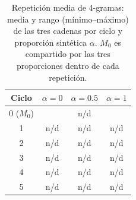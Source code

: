 
\begin{table}[ht]
\centering
\footnotesize
\begin{tabular}{c c c c}
\hline
Ciclo & $\alpha=0$ & $\alpha=0.5$ & $\alpha=1$ \\
\hline
0 ($M_0$) & \multicolumn{3}{c}{n/d} \\
1 & n/d & n/d & n/d \\
2 & n/d & n/d & n/d \\
3 & n/d & n/d & n/d \\
4 & n/d & n/d & n/d \\
5 & n/d & n/d & n/d \\
\hline
\end{tabular}
\caption{Repetición media de 4-gramas: media y rango (mínimo--máximo) de las tres cadenas por ciclo y proporción sintética $\alpha$. $M_0$ es compartido por las tres proporciones dentro de cada repetición.}
\label{tab:medias_repeat_4_mean}
\end{table}
